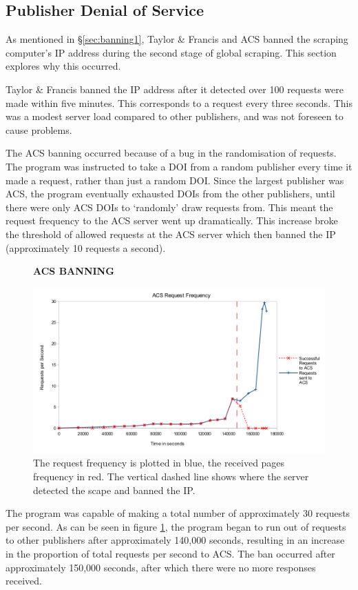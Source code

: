 \label{sec:data_acc_appendix}
\subsection{Publisher Denial of Service}
\label{sec:banning2}
As mentioned in \S\ref{sec:banning1}, Taylor \& Francis and ACS banned the scraping computer's IP address during the second stage of global scraping. This section explores why this occurred.

Taylor \& Francis banned the IP address after it detected over 100 requests were made within five minutes. This corresponds to a request every three seconds. This was a modest server load compared to other publishers, and was not foreseen to cause problems.

The ACS banning occurred because of a bug in the randomisation of requests. The program was instructed to take a DOI from a random publisher every time it made a request, rather than just a random DOI. Since the largest publisher was ACS, the program eventually exhausted DOIs from the other publishers, until there were only ACS DOIs to `randomly' draw requests from. This meant the request frequency to the ACS server went up dramatically. This increase broke the threshold of allowed requests at the ACS server which then banned the IP (approximately 10 requests a second).

\begin{figure}[H]
    \centering
    \textbf{ACS BANNING}\par\medskip
    \includegraphics[width=\textwidth]{Data_Acquisition/ACS_crash_line.png}
    \caption[Request Frequency Leading to ACS Ban]{The request frequency is plotted in blue, the received pages frequency in red. The vertical dashed line shows where the server detected the scape and banned the IP.}
     \label{fig:ACSBAN}
\end{figure}
The program was capable of making a total number of approximately 30 requests per second. As can be seen in figure \ref{fig:ACSBAN}, the program began to run out of requests to other publishers after approximately 140,000 seconds, resulting in an increase in the proportion of total requests per second to ACS. The ban occurred after approximately 150,000 seconds, after which there were no more responses received.

